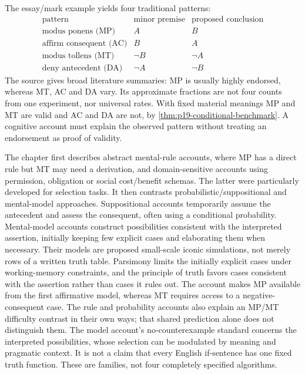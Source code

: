 The essay/mark example yields four traditional patterns:
\[
\begin{array}{c|c|c}
 \text{pattern}&\text{minor premise}&\text{proposed conclusion}\\\hline
 \text{modus ponens (MP)}&A&B\\
 \text{affirm consequent (AC)}&B&A\\
 \text{modus tollens (MT)}&\neg B&\neg A\\
 \text{deny antecedent (DA)}&\neg A&\neg B
\end{array}
\]
The source gives broad literature summaries: MP is usually highly
endorsed, whereas MT, AC and DA vary. Its approximate fractions are
not four counts from one experiment, nor universal rates. With fixed
material meanings MP and MT are valid and AC and DA are not, by
\cref{thm:p19-conditional-benchmark}. A cognitive account must explain
the observed pattern without treating an endorsement as proof of validity.

The chapter first describes abstract mental-rule accounts, where MP
has a direct rule but MT may need a derivation, and domain-sensitive
accounts using permission, obligation or social cost/benefit schemas.
The latter were particularly developed for selection tasks. It then
contrasts probabilistic/suppositional and mental-model approaches.
Suppositional accounts temporarily assume the antecedent and assess
the consequent, often using a conditional probability. Mental-model
accounts construct possibilities consistent with the interpreted assertion,
initially keeping few explicit cases and elaborating them when necessary.
Their models are proposed small-scale iconic simulations, not merely
rows of a written truth table. Parsimony limits the initially explicit
cases under working-memory constraints, and the principle of truth favors
cases consistent with the assertion rather than cases it rules out.
The account makes MP available from the first affirmative model, whereas
MT requires access to a negative-consequent case. The rule and probability
accounts also explain an MP/MT difficulty contrast in their own ways;
that shared prediction alone does not distinguish them. The model account's
no-counterexample standard concerns the interpreted possibilities, whose
selection can be modulated by meaning and pragmatic context. It is not
a claim that every English if-sentence has one fixed truth function.
These are families, not four completely specified algorithms.
\cite[Sec.~2, pp.~405--407]{ByrneEspino2021ConditionalCounterfactual}

